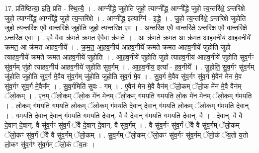 \documentclass[17pt]{extarticle}
\begin{document}
17. प्रति॑ष्ठित्या॒ इति॒ प्रति॑ - स्थि॒त्यै॒ । . आग्नी᳚द्ध्रे जुहोति जुहो॒ त्याग्नी᳚द्ध्र॒ आग्नी᳚द्ध्रे जुहो त्य॒न्तरि॑क्षे॒ ऽन्तरि॑क्षे जुहो॒ त्याग्नी᳚द्ध्र॒ आग्नी᳚द्ध्रे जुहो त्य॒न्तरि॑क्षे । . आग्नी᳚द्ध्र॒ इत्याग्नि॑ - इ॒द्ध्रे॒ । . जु॒हो॒ त्य॒न्तरि॑क्षे॒ ऽन्तरि॑क्षे जुहोति जुहो त्य॒न्तरि॑क्ष ए॒वै वान्तरि॑क्षे जुहोति जुहो त्य॒न्तरि॑क्ष ए॒व । . अ॒न्तरि॑क्ष ए॒वै वान्तरि॑क्षे॒ ऽन्तरि॑क्ष ए॒वै वान्तरि॑क्षे॒ ऽन्तरि॑क्ष ए॒वा । . ए॒वै वैवा क्र॑मते क्रमत॒ ऐवैवा क्र॑मते । . आ क्र॑मते क्रमत॒ आ क्र॑मत आहव॒नीय॑ आहव॒नीये᳚ क्रमत॒ आ क्र॑मत आहव॒नीये᳚ । . क्र॒म॒त॒ आ॒ह॒व॒नीय॑ आहव॒नीये᳚ क्रमते क्रमत आहव॒नीये॑ जुहोति जुहो त्याहव॒नीये᳚ क्रमते क्रमत आहव॒नीये॑ जुहोति । . आ॒ह॒व॒नीये॑ जुहोति जुहो त्याहव॒नीय॑ आहव॒नीये॑ जुहोति सुव॒र्गꣳ सु॑व॒र्गम् जु॑हो त्याहव॒नीय॑ आहव॒नीये॑ जुहोति सुव॒र्गम् । . आ॒ह॒व॒नीय॒ इत्या᳚ - ह॒व॒नीये᳚ । . जु॒हो॒ति॒ सु॒व॒र्गꣳ सु॑व॒र्गम् जु॑होति जुहोति सुव॒र्ग मे॒वैव सु॑व॒र्गम् जु॑होति जुहोति सुव॒र्ग मे॒व । . सु॒व॒र्ग मे॒वैव सु॑व॒र्गꣳ सु॑व॒र्ग मे॒वैन॑ मेन मे॒व सु॑व॒र्गꣳ सु॑व॒र्ग मे॒वैन᳚म् । . सु॒व॒र्गमिति॑ सुवः - गम् । . ए॒वैन॑ मेन मे॒वै वैन॑म् ॅलो॒कम् ॅलो॒क मे॑न मे॒वै वैन॑म् ॅलो॒कम् । . ए॒न॒म् ॅलो॒कम् ॅलो॒क मे॑न मेनम् ॅलो॒कम् ग॑मयति गमयति लो॒क मे॑न मेनम् ॅलो॒कम् ग॑मयति । . लो॒कम् ग॑मयति गमयति लो॒कम् ॅलो॒कम् ग॑मयति दे॒वान् दे॒वान् ग॑मयति लो॒कम् ॅलो॒कम् ग॑मयति दे॒वान् । . ग॒म॒य॒ति॒ दे॒वान् दे॒वान् ग॑मयति गमयति दे॒वान्. वै वै दे॒वान् ग॑मयति गमयति दे॒वान्. वै । . दे॒वान्. वै वै दे॒वान् दे॒वान्. वै सु॑व॒र्गꣳ सु॑व॒र्गं ॅवै दे॒वान् दे॒वान्. वै सु॑व॒र्गम् । . वै सु॑व॒र्गꣳ सु॑व॒र्गं ॅवै वै सु॑व॒र्गम् ॅलो॒कम् ॅलो॒कꣳ सु॑व॒र्गं ॅवै वै सु॑व॒र्गम् ॅलो॒कम् । . सु॒व॒र्गम् ॅलो॒कम् ॅलो॒कꣳ सु॑व॒र्गꣳ सु॑व॒र्गम् ॅलो॒कं ॅय॒तो य॒तो लो॒कꣳ सु॑व॒र्गꣳ सु॑व॒र्गम् ॅलो॒कं ॅय॒तः । \newline
\end{document}
